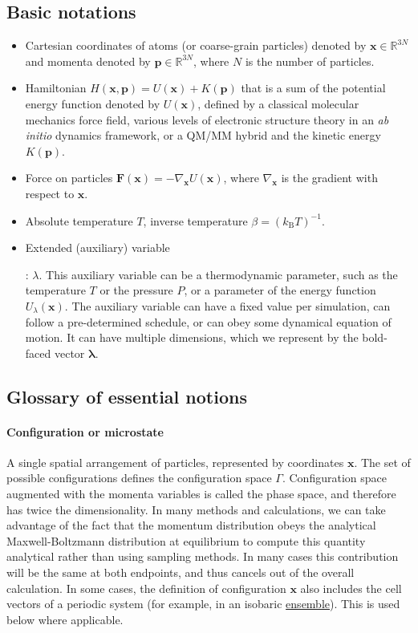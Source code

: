 \documentclass[9pt,review]{livecoms}
\newcommand{\vx}{\mathbf{x}}
\newcommand{\vp}{\mathbf{p}}
\newcommand{\vF}{\mathbf{F}}
\begin{document}
\subsection{Basic notations}
\label{sec:Notation}
\begin{itemize}
\item Cartesian coordinates of atoms (or coarse-grain particles) denoted by $\vx \in \mathbb{R}^{3N}$ and momenta denoted by $\vp \in \mathbb{R}^{3N}$, where $N$ is the number of particles.
\item Hamiltonian $H(\vx,\vp)=U(\vx)+K(\vp)$ that is a sum of the potential energy function denoted by $U(\vx)$, defined by a classical molecular mechanics force field, various levels of electronic structure theory in an \emph{ab initio} dynamics framework, or a QM/MM hybrid and the kinetic energy $K(\vp)$.
\item Force on particles $\vF(\vx) = -\nabla_\vx U(\vx)$, where $\nabla_\vx$ is the gradient with respect to $\vx$.
\item Absolute temperature $T$, inverse temperature $\beta = (k_\mathrm{B} T)^{-1}$.
\item \hypertarget{ref:AuxVar} {Extended (auxiliary) variable}: $\lambda$. This auxiliary variable can be a thermodynamic parameter, such as the temperature $T$ or the pressure $P$, or a parameter of the energy function $U_\lambda(\vx)$. The auxiliary variable can have a fixed value per simulation, can follow a pre-determined schedule, or can obey some dynamical equation of motion. It can have multiple dimensions, which we represent by the bold-faced vector $\boldsymbol{\lambda}$.

\end{itemize}

\subsection{Glossary of essential notions}
\label{sec:glossary}

\hypertarget{ref:Microstate} {\paragraph{Configuration or microstate}}
A single spatial arrangement of particles, represented by coordinates $\vx$. The set of possible configurations defines the configuration space $\Gamma$.
Configuration space augmented with the momenta variables is called the phase space, and therefore has twice the dimensionality. In many methods and calculations, we can take advantage of the fact that the momentum distribution obeys the analytical Maxwell-Boltzmann distribution at equilibrium to compute this quantity analytical rather than using sampling methods.  In many cases this contribution will be the same at both endpoints, and thus cancels out of the overall calculation.
In some cases, the  definition of configuration $\vx$ also includes the cell vectors of a periodic system (for example, in an isobaric \hyperlink{ref:Ensemble} {ensemble}).  This is used below where applicable.
\end{document}
